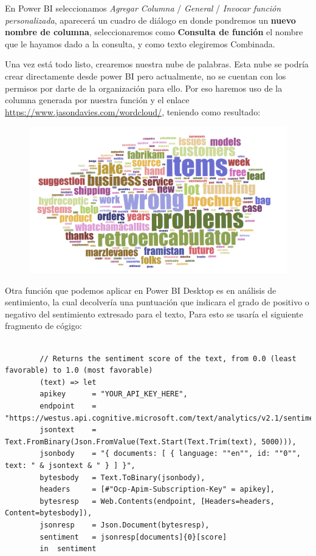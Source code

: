 \documentclass[runningheads]{llncs}
\begin{document}
	En Power BI seleccionamos \textit{Agregar Columna} / \textit{General} / \textit{Invocar función personalizada}, aparecerá un cuadro de diálogo en donde pondremos un \textbf{nuevo nombre de columna}, seleccionaremos como \textbf{Consulta de función} el nombre que le hayamos dado a la consulta, y como texto elegiremos Combinada.
	
	Una vez está todo listo, crearemos nuestra nube de palabras. Esta nube se podría crear directamente desde power BI pero actualmente, no se cuentan con los permisos por darte de la organización para ello. Por eso haremos uso de la columna generada por nuestra función y el enlace \url{https://www.jasondavies.com/wordcloud/}, teniendo como resultado: 
	
	\begin{figure}[H]
		\centering
		\includegraphics[scale=0.5]{./IA/AZURE/wordcloud.png}
	\end{figure}
	Otra función que podemos aplicar en Power BI Desktop es en análisis de sentimiento, la cual decolvería una puntuación que indicara el grado de positivo o negativo del sentimiento extresado para el texto, Para esto se usaría el siguiente fragmento de cógigo:
	
	\small{
		\begin{verbatim}
		
		// Returns the sentiment score of the text, from 0.0 (least favorable) to 1.0 (most favorable)
		(text) => let
		apikey      = "YOUR_API_KEY_HERE",
		endpoint    = "https://westus.api.cognitive.microsoft.com/text/analytics/v2.1/sentiment",
		jsontext    = Text.FromBinary(Json.FromValue(Text.Start(Text.Trim(text), 5000))),
		jsonbody    = "{ documents: [ { language: ""en"", id: ""0"", text: " & jsontext & " } ] }",
		bytesbody   = Text.ToBinary(jsonbody),
		headers     = [#"Ocp-Apim-Subscription-Key" = apikey],
		bytesresp   = Web.Contents(endpoint, [Headers=headers, Content=bytesbody]),
		jsonresp    = Json.Document(bytesresp),
		sentiment   = jsonresp[documents]{0}[score]
		in  sentiment
		\end{verbatim}
	}
\end{document}
